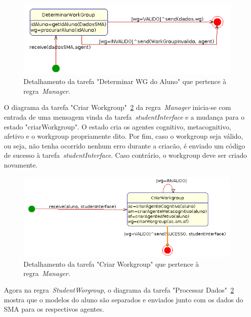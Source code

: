\begin{figure}
	\centering
	\includegraphics[scale=0.48]{images/td-determinar-wg.png}
	\caption{Detalhamento da tarefa "Determinar WG do Aluno" que pertence à regra~\emph{Manager}.}
	\label{fig:td-determinar-wg}
\end{figure}

O diagrama da tarefa "Criar Workgroup"~\ref{fig:td-criar-wg} da regra~\emph{Manager} inicia-se com entrada de uma mensagem vinda da tarefa~\emph{studentInterface} e a mudança para o estado "criarWorkgroup". O estado cria os agentes cognitivo, metacognitivo, afetivo e o workgroup propriamente dito. Por fim, caso o workgroup seja válido, ou seja, não tenha ocorrido nenhum erro durante a criacão, é enviado um código de sucesso à tarefa~\emph{studentInterface}. Caso contrário, o workgroup deve ser criado novamente.

\begin{figure}
	\centering
	\includegraphics[scale=0.48]{images/td-criar-wg.png}
	\caption{Detalhamento da tarefa "Criar Workgroup" que pertence à regra~\emph{Manager}.}
	\label{fig:td-criar-wg}
\end{figure}

Agora na regra~\emph{StudentWorgroup}, o diagrama da tarefa "Processar Dados"~\ref{fig:td-criar-wg} mostra que o modelos do aluno são separados e enviados junto com os dados do SMA para os respectivos agentes.

